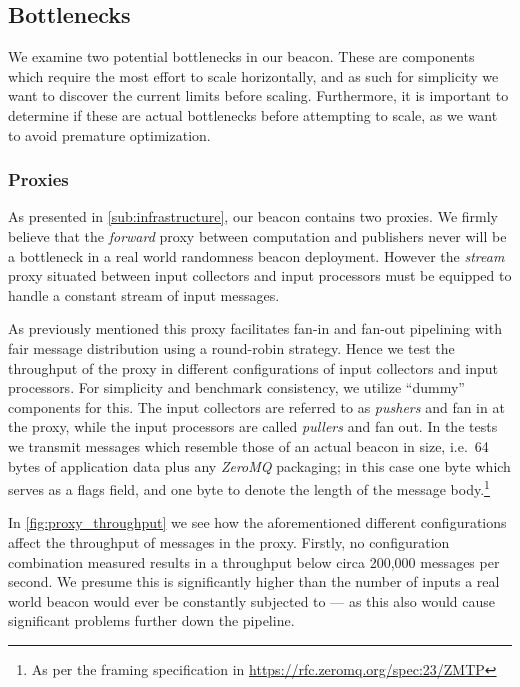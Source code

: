 \subsection{Bottlenecks}%
\label{sub:bottlenecks}

We examine two potential bottlenecks in our beacon.
These are components which require the most effort to scale horizontally, and as such for simplicity we want to discover the current limits before scaling.
Furthermore, it is important to determine if these are actual bottlenecks before attempting to scale, as we want to avoid premature optimization.

\subsubsection{Proxies}%
\label{ssub:proxies}
As presented in \vref{sub:infrastructure}, our beacon contains two proxies.
We firmly believe that the \textit{forward} proxy between computation and publishers never will be a bottleneck in a real world randomness beacon deployment.
However the \textit{stream} proxy situated between input collectors and input processors must be equipped to handle a constant stream of input messages.

As previously mentioned this proxy facilitates fan-in and fan-out pipelining with fair message distribution using a round-robin strategy.
Hence we test the throughput of the proxy in different configurations of input collectors and input processors.
For simplicity and benchmark consistency, we utilize \enquote{dummy} components for this.
The input collectors are referred to as \textit{pushers} and fan in at the proxy, while the input processors are called \textit{pullers} and fan out.
In the tests we transmit messages which resemble those of an actual beacon in size, i.e.\ 64 bytes of application data plus any \textit{ZeroMQ} packaging; in this case one byte which serves as a flags field, and one byte to denote the length of the message body.\footnote{As per the framing specification in \url{https://rfc.zeromq.org/spec:23/ZMTP}}

In \vref{fig:proxy_throughput} we see how the aforementioned different configurations affect the throughput of messages in the proxy.
Firstly, no configuration combination measured results in a throughput below circa 200,000 messages per second.
We presume this is significantly higher than the number of inputs a real world beacon would ever be constantly subjected to --- as this also would cause significant problems further down the pipeline.

